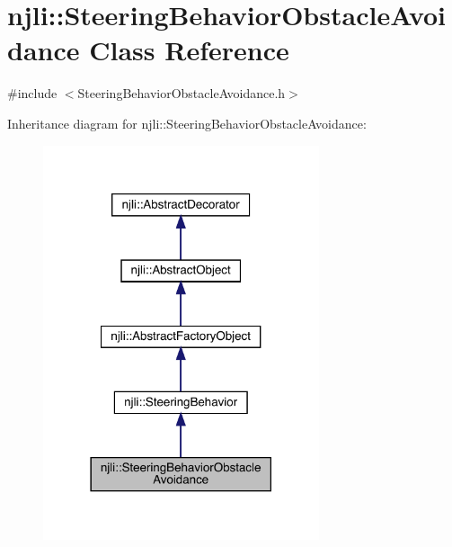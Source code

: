 \hypertarget{classnjli_1_1_steering_behavior_obstacle_avoidance}{}\section{njli\+:\+:Steering\+Behavior\+Obstacle\+Avoidance Class Reference}
\label{classnjli_1_1_steering_behavior_obstacle_avoidance}


{\ttfamily \#include $<$Steering\+Behavior\+Obstacle\+Avoidance.\+h$>$}



Inheritance diagram for njli\+:\+:Steering\+Behavior\+Obstacle\+Avoidance\+:\nopagebreak
\begin{figure}[H]
\begin{center}
\leavevmode
\includegraphics[width=230pt]{classnjli_1_1_steering_behavior_obstacle_avoidance__inherit__graph}
\end{center}
\end{figure}


